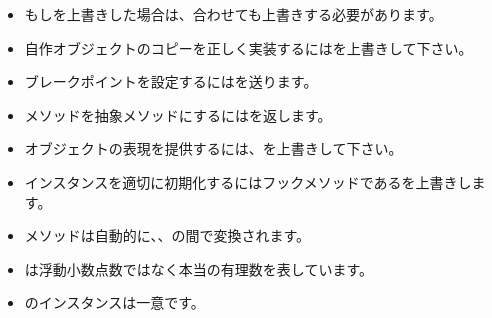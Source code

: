 \documentclass[a4paper,10pt,twoside]{book}
\begin{document}
\begin{itemize}

  \item もし\ct{=}を上書きした場合は、合わせても上書きする必要があります。

  \item 自作オブジェクトのコピーを正しく実装するにはを上書きして下さい。

  \item ブレークポイントを設定するにはを送ります。

  \item メソッドを抽象メソッドにするにはを返します。

  \item オブジェクトの表現を提供するには、を上書きして下さい。

  \item インスタンスを適切に初期化するにはフックメソッドであるを上書きします。

  \item {}メソッドは自動的に、、の間で変換されます。

  \item {}は浮動小数点数ではなく本当の有理数を表しています。

  \item {}のインスタンスは一意です。


\end{itemize}
\end{document}
